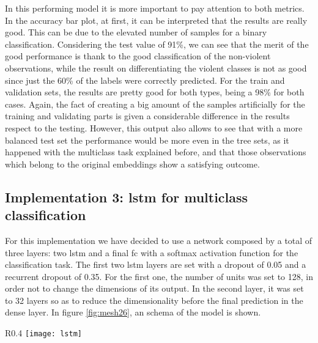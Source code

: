 	In this performing model it is more important to pay attention to both metrics. In the accuracy bar plot, at first, it can be interpreted that the results are really good. This can be due to the elevated number of samples for a binary classification. Considering the test value of 91\%, we can see that the merit of the good performance is thank to the good classification of the non-violent observations, while the result on differentiating the violent classes is not as good since just the 60\% of the labels were correctly predicted. For the train and validation sets, the results are pretty good for both types, being a 98\% for both cases. Again, the fact of creating a big amount of the samples artificially for the training and validating parts is given a considerable difference in the results respect to the testing. However, this output also allows to see that with a more balanced test set the performance would be more even in the tree sets, as it happened with the multiclass task explained before, and that those observations which belong to the original embeddings show a satisfying outcome.
	
\subsection{Implementation 3: \acrshort{lstm} for multiclass classification}

	For this implementation we have decided to use a network composed by a total of three layers: two \acrshort{lstm} and a final \acrlong{fc} with a softmax activation function for the classification task. The first two \acrshort{lstm} layers are set with a dropout of 0.05 and a recurrent dropout of 0.35. For the first one, the number of units was set to 128, in order not to change the dimensions of its output. In the second layer, it was set to 32 layers so as to reduce the dimensionality before the final prediction in the dense layer. In figure \ref{fig:mesh26}, an schema of the model is shown.

	\begin{wrapfigure}{R}{0.4\textwidth}
		\centering
		\captionsetup{justification=centering}
		\texttt{[image: lstm]}
		\caption{Architecture for the LSTM multiclass classifier implementation}
		\label{fig:mesh26}
	\end{wrapfigure}
	
